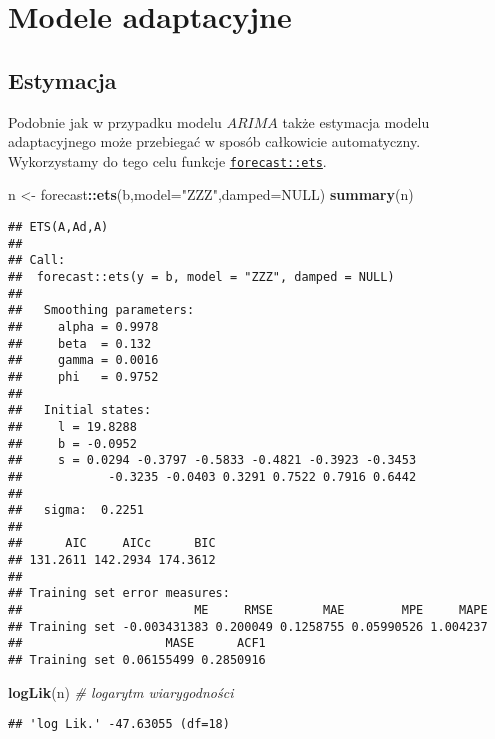 \documentclass[polish,]{book}
\newenvironment{Shaded}{\begin{snugshade}}{\end{snugshade}}
\newcommand{\CommentTok}[1]{\textcolor[rgb]{0.56,0.35,0.01}{\textit{#1}}}
\newcommand{\DataTypeTok}[1]{\textcolor[rgb]{0.13,0.29,0.53}{#1}}
\newcommand{\KeywordTok}[1]{\textcolor[rgb]{0.13,0.29,0.53}{\textbf{#1}}}
\newcommand{\NormalTok}[1]{#1}
\newcommand{\OperatorTok}[1]{\textcolor[rgb]{0.81,0.36,0.00}{\textbf{#1}}}
\newcommand{\OtherTok}[1]{\textcolor[rgb]{0.56,0.35,0.01}{#1}}
\newcommand{\StringTok}[1]{\textcolor[rgb]{0.31,0.60,0.02}{#1}}
\begin{document}
\hypertarget{part_74}{%
\section{Modele adaptacyjne}\label{part_74}}

\hypertarget{part_741}{%
\subsection{Estymacja}\label{part_741}}

Podobnie jak w przypadku modelu \(ARIMA\) także estymacja modelu adaptacyjnego
może przebiegać w sposób całkowicie automatyczny. Wykorzystamy do tego celu
funkcje \href{https://rdrr.io/cran/forecast/man/ets.html}{\texttt{forecast::ets}}.

\begin{Shaded}
\begin{Highlighting}[]
\NormalTok{n <-}\StringTok{ }\NormalTok{forecast}\OperatorTok{::}\KeywordTok{ets}\NormalTok{(b,}\DataTypeTok{model=}\StringTok{"ZZZ"}\NormalTok{,}\DataTypeTok{damped=}\OtherTok{NULL}\NormalTok{)}
\KeywordTok{summary}\NormalTok{(n)}
\end{Highlighting}
\end{Shaded}

\begin{verbatim}
## ETS(A,Ad,A) 
## 
## Call:
##  forecast::ets(y = b, model = "ZZZ", damped = NULL) 
## 
##   Smoothing parameters:
##     alpha = 0.9978 
##     beta  = 0.132 
##     gamma = 0.0016 
##     phi   = 0.9752 
## 
##   Initial states:
##     l = 19.8288 
##     b = -0.0952 
##     s = 0.0294 -0.3797 -0.5833 -0.4821 -0.3923 -0.3453
##            -0.3235 -0.0403 0.3291 0.7522 0.7916 0.6442
## 
##   sigma:  0.2251
## 
##      AIC     AICc      BIC 
## 131.2611 142.2934 174.3612 
## 
## Training set error measures:
##                        ME     RMSE       MAE        MPE     MAPE
## Training set -0.003431383 0.200049 0.1258755 0.05990526 1.004237
##                    MASE      ACF1
## Training set 0.06155499 0.2850916
\end{verbatim}

\begin{Shaded}
\begin{Highlighting}[]
\KeywordTok{logLik}\NormalTok{(n) }\CommentTok{# logarytm wiarygodności}
\end{Highlighting}
\end{Shaded}

\begin{verbatim}
## 'log Lik.' -47.63055 (df=18)
\end{verbatim}
\end{document}
